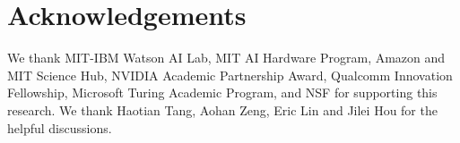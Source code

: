 \documentclass{article}
\begin{document}



\newcommand{\printAffiliations}[1]{%
\stepcounter{@affiliationcounter}%
{\let\thefootnote\relax\footnotetext{\hspace*{-\footnotesep}\ifdefined\isaccepted #1\fi%
\forloop{@affilnum}{1}{\value{@affilnum} < \value{@affiliationcounter}}{
\textsuperscript{\arabic{@affilnum}}\ifcsname @affilname\the@affilnum\endcsname%
\csname @affilname\the@affilnum\endcsname%
\else
{\bf AUTHORERR: Missing \textbackslash{}icmlaffiliation.}
\fi
}.
\ifdefined\icmlcorrespondingauthor@text
Correspondence to: \icmlcorrespondingauthor@text.
\else
{\bf AUTHORERR: Missing \textbackslash{}icmlcorrespondingauthor.}
\fi
}
}
}
\printAffiliationsAndNotice{\icmlEqualContribution} %









\section*{Acknowledgements}
We thank MIT-IBM Watson AI Lab,  
MIT AI Hardware Program,
Amazon and MIT Science Hub, 
NVIDIA Academic Partnership Award,  
Qualcomm Innovation Fellowship, 
Microsoft Turing Academic Program, and NSF for supporting this research. We thank Haotian Tang, Aohan Zeng, Eric Lin and Jilei Hou for the helpful discussions.





\clearpage
\appendix

\end{document}
